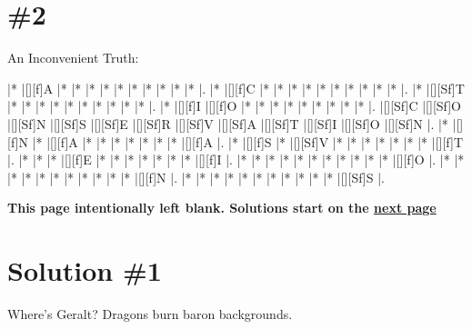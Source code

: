 \documentclass[letterpaper]{article}
\begin{document}
\vspace*{-0.5cm}
\section*{\#2}

An Inconvenient Truth:
\vspace*{1em}
\begin{Puzzle}{12}{11}
|*        |[][f]A   |*        |*        |*        |*        |*        |*        |*        |*        |*        |*        |. 
|*        |[][f]C   |*        |*        |*        |*        |*        |*        |*        |*        |*        |*        |.  
|*        |[][Sf]T  |*        |*        |*        |*        |*        |*        |*        |*        |*        |*        |.
|*        |[][f]I   |[][f]O   |*        |*        |*        |*        |*        |*        |*        |*        |*        |.  
|[][Sf]C  |[][Sf]O  |[][Sf]N  |[][Sf]S  |[][Sf]E  |[][Sf]R  |[][Sf]V  |[][Sf]A  |[][Sf]T  |[][Sf]I  |[][Sf]O  |[][Sf]N  |.
|*        |[][f]N   |*        |[][f]A   |*        |*        |*        |*        |*        |*        |*        |[][f]A   |. 
|*        |[][f]S   |*        |[][Sf]V  |*        |*        |*        |*        |*        |*        |*        |[][f]T   |.
|*        |*        |*        |[][f]E   |*        |*        |*        |*        |*        |*        |*        |[][f]I   |.
|*        |*        |*        |*        |*        |*        |*        |*        |*        |*        |*        |[][f]O   |.
|*        |*        |*        |*        |*        |*        |*        |*        |*        |*        |*        |[][f]N   |.
|*        |*        |*        |*        |*        |*        |*        |*        |*        |*        |*        |[][Sf]S  |.
\end{Puzzle}

\newpage
\begin{center}
\textbf{This page intentionally left blank. Solutions start on the \hyperlink{page.3}{next page}}
\end{center}

\newpage

\section*{Solution \#1}
Where's Geralt? Dragons burn baron backgrounds.
\end{document}
